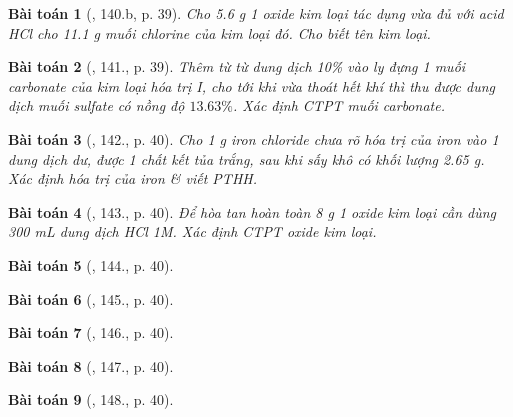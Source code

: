 \documentclass{article}
\newtheorem{baitoan}{Bài toán}
\begin{document}
\begin{baitoan}[\cite{An_400_BT_Hoa_Hoc_9}, 140.b, p. 39]
	Cho {\rm5.6 g} 1 oxide kim loại tác dụng vừa đủ với acid {\rm HCl} cho {\rm11.1 g} muối chlorine của kim loại đó. Cho biết tên kim loại.
\end{baitoan}

\begin{baitoan}[\cite{An_400_BT_Hoa_Hoc_9}, 141., p. 39]
	Thêm từ từ dung dịch {\rm{} 10\%} vào ly đựng 1 muối carbonate của kim loại hóa trị I, cho tới khi vừa thoát hết khí {\rm{}} thì thu được dung dịch muối sulfate có nồng độ $13.63\%$. Xác định {\rm CTPT} muối carbonate.
\end{baitoan}

\begin{baitoan}[\cite{An_400_BT_Hoa_Hoc_9}, 142., p. 40]
	Cho {\rm1 g} iron chloride chưa rõ hóa trị của iron vào 1 dung dịch {\rm{}} dư, được 1 chất kết tủa trắng, sau khi sấy khô có khối lượng {\rm2.65 g}. Xác định hóa trị của iron \& viết {\rm PTHH}.
\end{baitoan}

\begin{baitoan}[\cite{An_400_BT_Hoa_Hoc_9}, 143., p. 40]
	Để hòa tan hoàn toàn {\rm8 g} 1 oxide kim loại cần dùng {\rm300 mL} dung dịch {\rm HCl 1M}. Xác định {\rm CTPT} oxide kim loại.
\end{baitoan}

\begin{baitoan}[\cite{An_400_BT_Hoa_Hoc_9}, 144., p. 40]
	
\end{baitoan}

\begin{baitoan}[\cite{An_400_BT_Hoa_Hoc_9}, 145., p. 40]
	
\end{baitoan}

\begin{baitoan}[\cite{An_400_BT_Hoa_Hoc_9}, 146., p. 40]
	
\end{baitoan}

\begin{baitoan}[\cite{An_400_BT_Hoa_Hoc_9}, 147., p. 40]
	
\end{baitoan}

\begin{baitoan}[\cite{An_400_BT_Hoa_Hoc_9}, 148., p. 40]
	
\end{baitoan}
\end{document}
